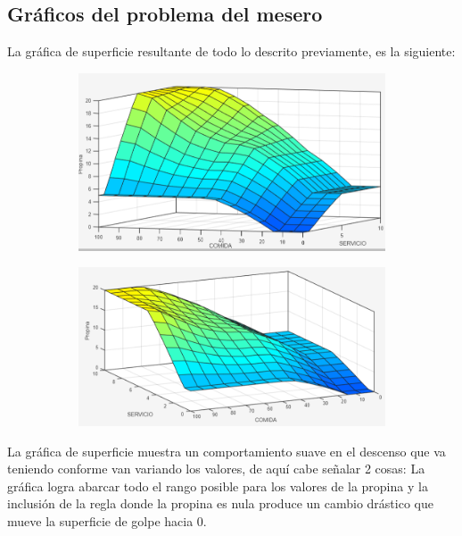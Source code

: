 \documentclass[11pt, letterpaper]{article}
\begin{document}
\newpage

\subsection{Gráficos del problema del mesero}

La gráfica de superficie resultante de todo lo descrito previamente, es la siguiente:

\begin{figure}[h]
	\centering
	\begin{subfigure}{0.42\textwidth} %
		\centering
		\includegraphics[width=1.3\textwidth]{IMG/P14.png}
		\label{fig:G1}
	\end{subfigure}
	\hfill
	\begin{subfigure}{0.43\textwidth} %
		\centering
		\includegraphics[width=1.2\textwidth]{IMG/P15.png}
		\label{fig:G2}
	\end{subfigure}
	\label{fig:comparacion1}
\end{figure}

La gráfica de superficie muestra un comportamiento suave en el descenso que va teniendo conforme van variando los valores, de aquí cabe señalar 2 cosas: La gráfica logra abarcar todo el rango posible para los valores de la propina y la inclusión de la regla donde la propina es nula produce un cambio drástico que mueve la superficie de golpe hacia 0. 
\end{document}
